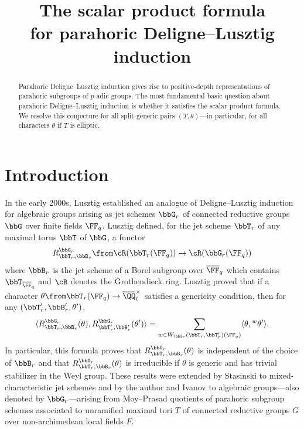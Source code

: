 
\title{The scalar product formula \\  for parahoric Deligne--Lusztig induction}
\maketitle

\begin{abstract}
  Parahoric Deligne--Lusztig induction gives rise to positive-depth representations of parahoric subgroups of $p$-adic groups. The most fundamental basic question about parahoric Deligne--Lusztig induction is whether it satisfies the scalar product formula. We resolve this conjecture for all split-generic pairs $(T,\theta)$---in particular, for all characters $\theta$ if $T$ is elliptic.  
\end{abstract}

\section{Introduction}\label{sec:introduction}

In the early 2000s, Lusztig established \cite{Lus04} an analogue of Deligne--Lusztig induction for algebraic groups arising as jet schemes $\bbG_r$ of connected reductive groups $\bbG$ over finite fields $\FF_q$. Lusztig defined, for the jet scheme $\bbT_r$ of any maximal torus $\bbT$ of $\bbG$, a functor
\begin{equation*}
  R_{\bbT_r, \bbB_r}^{\bbG_r} \from \cR(\bbT_r(\FF_q)) \to \cR(\bbG_r(\FF_q))
\end{equation*}
where $\bbB_r$ is the jet scheme of a Borel subgroup  over $\overline \FF_q$ which contains $\bbT_{\overline \FF_q}$ and $\cR$ denotes the Grothendieck ring. Lusztig proved that if a character $\theta \from \bbT_r(\FF_q) \to \overline \QQ_\ell^\times$ satisfies a genericity condition, then for any $(\bbT_r', \bbB_r', \theta')$, 
\begin{equation}\label{eq:scalar product}
  \langle R_{\bbT_r,\bbB_r}^{\bbG_r}(\theta), R_{\bbT_r',\bbB_r'}^{\bbG_r}(\theta') \rangle = \sum_{w \in W_{\bbG_r}(\bbT_r,\bbT_r')(\FF_q)} \langle \theta, {}^w \theta' \rangle.
\end{equation}
In particular, this formula proves that $R_{\bbT_r,\bbB_r}^{\bbG_r}(\theta)$ is independent of the choice of $\bbB_r$ and that $R_{\bbT_r,\bbB_r}^{\bbG_r}(\theta)$ is irreducible if $\theta$ is generic and has trivial stabilizer in the Weyl group. These results were extended by Stasinski \cite{Sta09} to mixed-characteristic jet schemes and by the author and Ivanov \cite{CI21-RT} to algebraic groups---also denoted by $\bbG_r$---arising from Moy--Prasad quotients of parahoric subgroup schemes associated to unramified maximal tori $T$ of connected reductive groups $G$ over non-archimedean local fields $F$. 

